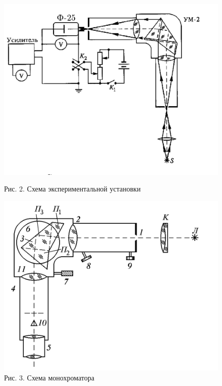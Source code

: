 \documentclass[a4paper,12pt]{article}
\begin{document}
\begin{figure}[H]
  \centering
  \begin{minipage}[b]{0.45\textwidth}
    \includegraphics[width=\textwidth]{scheme1.png}
    \caption*{Рис. 2. Схема экспериментальной установки}
  \end{minipage}
  \hfill
  \begin{minipage}[b]{0.45\textwidth}
    \includegraphics[width=\textwidth]{scheme2.png}
    \caption*{Рис. 3. Схема монохроматора}
  \end{minipage}
\end{figure}
\end{document}
